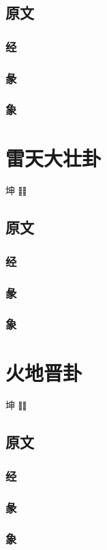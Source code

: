 \documentclass[12pt,oneside]{book}
\begin{document}
\section{原文}
\subsection{经}
\subsection{彖}
\subsection{象}


\chapter{雷天大壮卦}
坤 ䷁

\section{原文}
\subsection{经}
\subsection{彖}
\subsection{象}


\chapter{火地晋卦}
坤 ䷁

\section{原文}
\subsection{经}
\subsection{彖}
\subsection{象}
\end{document}
